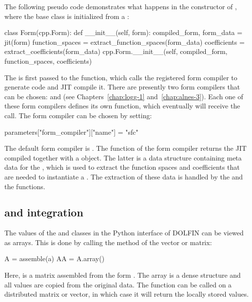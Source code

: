 The following pseudo code demonstrates what happens in the constructor
of , where the base class  is initialized
from a :
\begin{python}
class Form(cpp.Form):
    def __init__(self, form):
        compiled_form, form_data = jit(form)
        function_spaces = extract_function_spaces(form_data)
        coefficients = extract_coefficients(form_data)
        cpp.Form.__init__(self, compiled_form, function_spaces, coefficients)
\end{python}
The  is first passed to the  function,
which calls the registered form compiler to generate code and JIT
compile it. There are presently two form compilers that can be
chosen:  and  (see Chapters~\ref{chap:logg-1}
and~\ref{chap:alnes-3}). Each one of these form compilers defines its
own  function, which eventually will receive the call. The form
compiler can be chosen by setting:
\begin{python}
parameters["form_compiler"]["name"] = "sfc"
\end{python}
The default form compiler is . The  function of
the form compiler returns the JIT compiled  together
with a  object. The latter is a data structure
containing meta data for the , which is used to extract
the function spaces and coefficients that are needed to instantiate a
. The extraction of these data is handled by the
 and the 
functions.

\subsection{\numpy and \scipy integration}

The values of the  and  classes in the Python
interface of DOLFIN can be viewed as \numpy arrays. This is done by
calling the  method of the vector or matrix:
\begin{python}
A  = assemble(a)
AA = A.array()
\end{python}
Here,  is a matrix assembled from the form . The \numpy
array  is a dense structure and all values are copied from the
original data. The  function can be called on a distributed
matrix or vector, in which case it will return the locally stored
values.


